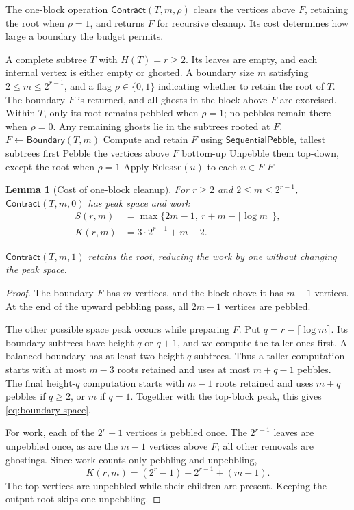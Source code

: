 \documentclass[11pt]{article}
\newtheorem{lemma}[lemma]{Lemma}
\theoremstyle{definition}
\theoremstyle{remark}
\newcommand{\Fast}{\mathsf{SequentialPebble}}
\newcommand{\Release}{\mathsf{Release}}
\newcommand{\Contract}{\mathsf{Contract}}
\begin{document}
The one-block operation $\Contract(T,m,\rho)$ clears the vertices above $F$, retaining the root when $\rho=1$, and returns $F$ for recursive cleanup. Its cost determines how large a boundary the budget permits.


\begin{algorithm}[H]
\caption{One-block cleanup $\Contract(T,m,\rho)$}
\label{alg:block-contract}
\begin{algorithmic}[1]
\Require A complete subtree $T$ with $H(T)=r\ge2$. Its leaves are empty, and each internal vertex is either empty or ghosted.
\Require A boundary size $m$ satisfying $2\le m\le2^{r-1}$, and a flag $\rho\in\{0,1\}$ indicating whether to retain the root of $T$.
\Ensure The boundary $F$ is returned, and all ghosts in the block above $F$ are exorcised. Within $T$, only its root remains pebbled when $\rho=1$; no pebbles remain there when $\rho=0$. Any remaining ghosts lie in the subtrees rooted at $F$.
\State $F\gets\mathsf{Boundary}(T,m)$
\State Compute and retain $F$ using $\Fast$, tallest subtrees first
\State Pebble the vertices above $F$ bottom-up
\State Unpebble them top-down, except the root when $\rho=1$
\State Apply $\Release(u)$ to each $u\in F$
\State \Return $F$
\end{algorithmic}
\end{algorithm}



\begin{lemma}[Cost of one-block cleanup]
\label{lem:contract}
For $r\ge2$ and $2\le m\le2^{r-1}$, $\Contract(T,m,0)$ has peak space and work
\begin{align}
 S(r,m)&=\max\{2m-1,\ r+m-\lceil\log m\rceil\}, \label{eq:boundary-space}\\
 K(r,m)&=3\cdot2^{r-1}+m-2. \label{eq:block-work}
\end{align}

$\Contract(T,m,1)$ retains the root, reducing the work by one without changing the peak space.
\end{lemma}

\begin{proof}
The boundary $F$ has $m$ vertices, and the block above it has $m-1$ vertices. At the end of the upward pebbling pass, all $2m-1$ vertices are pebbled.

The other possible space peak occurs while preparing $F$. Put $q=r-\lceil\log m\rceil$. Its boundary subtrees have height $q$ or $q+1$, and we compute the taller ones first. A balanced boundary has at least two height-$q$ subtrees. Thus a taller computation starts with at most $m-3$ roots retained and uses at most $m+q-1$ pebbles. The final height-$q$ computation starts with $m-1$ roots retained and uses $m+q$ pebbles if $q\ge2$, or $m$ if $q=1$. Together with the top-block peak, this gives \cref{eq:boundary-space}.

For work, each of the $2^r-1$ vertices is pebbled once. The $2^{r-1}$ leaves are unpebbled once, as are the $m-1$ vertices above $F$; all other removals are ghostings. Since work counts only pebbling and unpebbling,
\[
 K(r,m)=(2^r-1)+2^{r-1}+(m-1).
\]
The top vertices are unpebbled while their children are present. Keeping the output root skips one unpebbling.
\end{proof}
\end{document}
